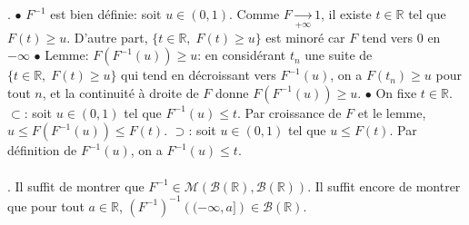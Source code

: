 \documentclass{report}
\begin{document}
\subsection{} \noindent{}\\ 
\\ 
\\
. $\bullet$ $F^{-1}$ est bien définie: soit $u\in (0,1)$. Comme $F\xrightarrow[+ \infty]{} 1$, il existe $t\in \mathbb R$ tel que $F(t)\geq u$. D'autre part, $\{ t\in \mathbb R, \; F(t)\geq u\}$ est minoré car $F$ tend vers $0$ en $-\infty$\newline
$\bullet$ Lemme: $F(F^{-1}(u))\geq u$: en considérant $t_n$ une suite de $\{ t\in \mathbb R, \; F(t)\geq u\}$ qui tend en décroissant vers $F^{-1}(u)$, on a $F(t_n)\geq u$ pour tout $n$, et la continuité à droite de $F$ donne  $F(F^{-1}(u))\geq u$.  \newline
$\bullet$ On fixe $t\in \mathbb R$.\newline
$\subset$: soit $u\in (0,1)$ tel que $F^{-1}(u)\leq t$.
Par croissance de $F$ et le lemme, $u\leq F(F^{-1}(u))\leq F(t)$.\newline
$\supset$: soit $u\in (0,1)$ tel que $u\leq F(t)$. Par définition de $F^{-1}(u)$, on a $F^{-1}(u)\leq t$.
 \\ \\
. Il suffit de montrer que $F^{-1} \in \mathcal M(\mathcal B(\mathbb R),\mathcal B(\mathbb R))$. Il suffit encore de montrer que pour tout $a\in \mathbb R$, $\left( F^{-1}\right)^{-1} \left((-\infty, a]\right) \in \mathcal B(\mathbb R)$.\newline
\end{document}
